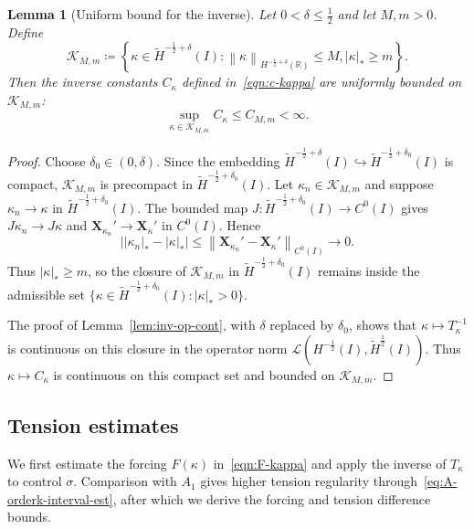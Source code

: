 \documentclass[11pt,reqno]{amsart}
\theoremstyle{plain}
\newtheorem{lemma}[theorem]{Lemma}
\theoremstyle{definition}
\numberwithin{equation}{section}
\newcommand{\mc}[1]{\mathcal{#1}}
\newcommand{\wt}[1]{\widetilde{#1}}
\newcommand{\bm}[1]{\boldsymbol{#1}}
\newcommand{\abs}[1]{\left\lvert #1 \right\rvert}
\newcommand{\norm}[1]{\left\lVert #1 \right\rVert}
\newcommand{\R}{\mathbb{R}}
\newcommand{\ci}[1]{C^{#1}(I)}
\newcommand{\hi}[1]{H^{#1}(I)}
\newcommand{\thi}[1]{\wt H^{#1}(I)}
\newcommand{\hr}[1]{H^{#1}(\R)}
\begin{document}
\begin{lemma}[Uniform bound for the inverse]\label{lem:c-kappa}
Let $0<\delta\le\frac{1}{2}$ and let $M,m>0$. Define
\begin{equation}
    \mc K_{M,m}
    \coloneqq
    \left\{
    \kappa\in\thi{-\frac{1}{2}+\delta}:
    \norm{\kappa}_{\hr{-\frac{1}{2}+\delta}}\le M,
    \abs{\kappa}_*\ge m
    \right\}.
\end{equation}
Then the inverse constants $C_\kappa$ defined in~\eqref{eqn:c-kappa} are
uniformly bounded on $\mc K_{M,m}$:
\begin{equation}\label{eqn:inverse-uniform-bound}
    \sup_{\kappa\in\mc K_{M,m}} C_\kappa \le C_{M,m}<\infty.
\end{equation}
\end{lemma}
\begin{proof}
Choose $\delta_0\in(0,\delta)$. Since the embedding
$\thi{-\frac{1}{2}+\delta}\hookrightarrow\thi{-\frac{1}{2}+\delta_0}$ is
compact, $\mc K_{M,m}$ is precompact in
$\thi{-\frac{1}{2}+\delta_0}$.
Let $\kappa_n\in\mc K_{M,m}$ and suppose
$\kappa_n\to\kappa$ in $\thi{-\frac{1}{2}+\delta_0}$. The bounded map
$J:\thi{-\frac{1}{2}+\delta_0}\to C^0(I)$ gives
$J\kappa_n\to J\kappa$ and
$\bm X_{\kappa_n}'\to\bm X_{\kappa}'$ in $C^0(I)$. Hence
\begin{equation}
    \abs{\abs{\kappa_n}_*-\abs{\kappa}_*}
    \le \norm{\bm X_{\kappa_n}'-\bm X_{\kappa}'}_{\ci{0}}\to0.
\end{equation}
Thus $\abs{\kappa}_*\ge m$, so the closure of $\mc K_{M,m}$ in
$\thi{-\frac{1}{2}+\delta_0}$ remains inside the admissible set
$\{\kappa\in\thi{-\frac{1}{2}+\delta_0}:\abs{\kappa}_*>0\}$.

The proof of Lemma~\ref{lem:inv-op-cont}, with $\delta$ replaced by
$\delta_0$, shows that
$\kappa\mapsto T_\kappa^{-1}$ is continuous
on this closure in the operator norm
$\mc L(\hi{-\frac{1}{2}},\thi{\frac{1}{2}})$. Thus
$\kappa\mapsto C_\kappa$ is continuous on this compact set and bounded on
$\mc K_{M,m}$.
\end{proof}

\subsection{Tension estimates}
\label{subsec:nonlinear-estimates}

We first estimate the forcing $F(\kappa)$ in~\eqref{eqn:F-kappa} and apply
the inverse of $T_\kappa$ to control $\sigma$.
Comparison with $A_1$ gives higher tension regularity
through~\eqref{eq:A-orderk-interval-est}, after which we derive the forcing
and tension difference bounds.
\end{document}
